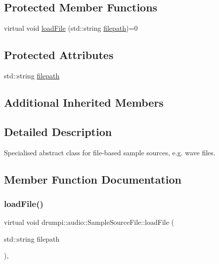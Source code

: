 \subsection*{Protected Member Functions}
\begin{DoxyCompactItemize}
\item 
virtual void \hyperlink{classdrumpi_1_1audio_1_1SampleSourceFile_a3a919325368cd163435f5ea6ad9fd4ec}{load\+File} (std\+::string \hyperlink{classdrumpi_1_1audio_1_1SampleSourceFile_a0d6461310f720bf9a25e7c274f57053b}{filepath})=0
\end{DoxyCompactItemize}
\subsection*{Protected Attributes}
\begin{DoxyCompactItemize}
\item 
std\+::string \hyperlink{classdrumpi_1_1audio_1_1SampleSourceFile_a0d6461310f720bf9a25e7c274f57053b}{filepath}
\end{DoxyCompactItemize}
\subsection*{Additional Inherited Members}


\subsection{Detailed Description}
Specialised abstract class for file-\/based sample sources, e.\+g. wave files. 

\subsection{Member Function Documentation}
\mbox{\label{classdrumpi_1_1audio_1_1SampleSourceFile_a3a919325368cd163435f5ea6ad9fd4ec}} 
\subsubsection{\texorpdfstring{load\+File()}{loadFile()}}
{\footnotesize\ttfamily virtual void drumpi\+::audio\+::\+Sample\+Source\+File\+::load\+File (\begin{DoxyParamCaption}\item[{std\+::string}]{filepath }\end{DoxyParamCaption})\hspace{0.3cm}{\ttfamily [protected]}, {}}


